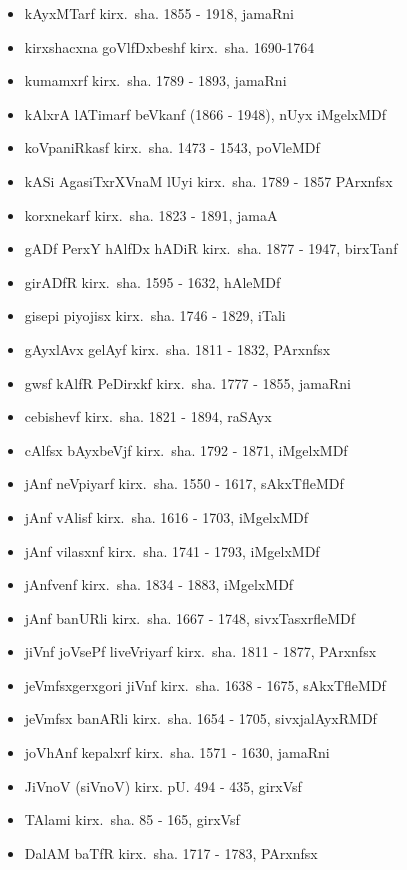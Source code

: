 {\begin{itemize}
\item kAyxMTarf kirx.~sha. {\rm 1855 - 1918}, jamaRni
\item kirxshacxna goVlfDxbeshf kirx.~sha. {\rm 1690-1764}
\item kumamxrf kirx.~sha. {\rm 1789 - 1893}, jamaRni
\item kAlxrA lATimarf beVkanf {\rm (1866 - 1948)}, nUyx iMgelxMDf
\item koVpaniRkasf kirx.~sha. {\rm 1473 - 1543}, poVleMDf
\item kASi AgasiTxrXVnaM lUyi kirx.~sha. {\rm 1789 - 1857} PArxnfsx
\item korxnekarf kirx.~sha. {\rm 1823 - 1891}, jamaA
\item gADf PerxY hAlfDx hADiR kirx.~sha. {\rm 1877 - 1947}, birxTanf
\item girADfR kirx.~sha. {\rm 1595 - 1632}, hAleMDf
\item gisepi piyojisx kirx.~sha. {\rm 1746 - 1829}, iTali
\item gAyxlAvx gelAyf kirx.~sha. {\rm 1811 - 1832}, PArxnfsx
\item gwsf kAlfR PeDirxkf kirx.~sha. {\rm 1777 - 1855}, jamaRni
\item cebishevf kirx.~sha. {\rm 1821 - 1894}, raSAyx
\item cAlfsx bAyxbeVjf kirx.~sha. {\rm 1792 - 1871}, iMgelxMDf
\item jAnf neVpiyarf kirx.~sha. {\rm 1550 - 1617}, sAkxTfleMDf
\item jAnf vAlisf kirx.~sha. {\rm 1616 - 1703}, iMgelxMDf
\item jAnf vilasxnf kirx.~sha. {\rm 1741 - 1793}, iMgelxMDf
\item jAnfvenf kirx.~sha. {\rm 1834 - 1883}, iMgelxMDf
\item jAnf banURli kirx.~sha. {\rm 1667 - 1748}, sivxTasxrfleMDf
\item jiVnf joVsePf liveVriyarf kirx.~sha. {\rm 1811 - 1877}, PArxnfsx
\item jeVmfsxgerxgori jiVnf kirx.~sha. {\rm 1638 - 1675}, sAkxTfleMDf
\item jeVmfsx banARli kirx.~sha. {\rm 1654 - 1705}, sivxjalAyxRMDf
\item joVhAnf kepalxrf kirx.~sha. {\rm 1571 - 1630}, jamaRni
\item JiVnoV (siVnoV) kirx. pU. {\rm 494 - 435}, girxVsf
\item TAlami kirx.~sha. {\rm 85 - 165}, girxVsf
\item DalAM baTfR kirx.~sha. {\rm 1717 - 1783}, PArxnfsx

\end{itemize}}
